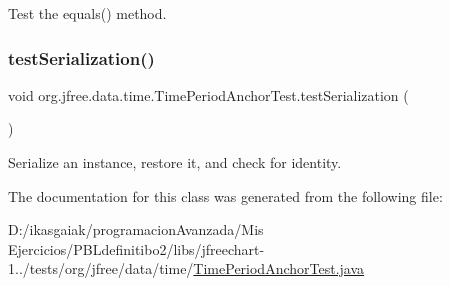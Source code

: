 Test the equals() method. \mbox{\label{classorg_1_1jfree_1_1data_1_1time_1_1_time_period_anchor_test_a9fd367ea7966be4dcb5e317df32f1bef}} 
\subsubsection{\texorpdfstring{test\+Serialization()}{testSerialization()}}
{\footnotesize\ttfamily void org.\+jfree.\+data.\+time.\+Time\+Period\+Anchor\+Test.\+test\+Serialization (\begin{DoxyParamCaption}{ }\end{DoxyParamCaption})}

Serialize an instance, restore it, and check for identity. 

The documentation for this class was generated from the following file\+:\begin{DoxyCompactItemize}
\item 
D\+:/ikasgaiak/programacion\+Avanzada/\+Mis Ejercicios/\+P\+B\+Ldefinitibo2/libs/jfreechart-\/1../tests/org/jfree/data/time/\mbox{\hyperlink{_time_period_anchor_test_8java}{Time\+Period\+Anchor\+Test.\+java}}\end{DoxyCompactItemize}
